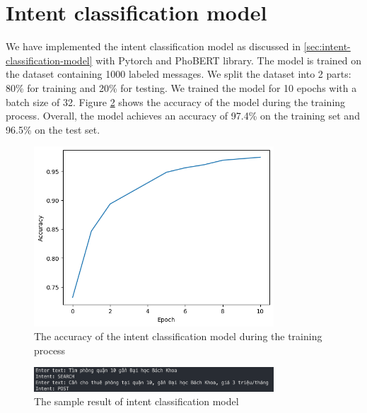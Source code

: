 \section{Intent classification model}
We have implemented the intent classification model as discussed in \ref{sec:intent-classification-model} with Pytorch and PhoBERT library. The model is trained on the dataset containing 1000 labeled messages. We split the dataset into 2 parts: 80\% for training and 20\% for testing. We trained the model for 10 epochs with a batch size of 32. Figure \ref{fig:intent-classification-result} shows the accuracy of the model during the training process. Overall, the model achieves an accuracy of 97.4\% on the training set and 96.5\% on the test set. 

\begin{figure}[ht]
    \centering
    \includegraphics[width=0.8\textwidth]{Images/9.Implementation/intent_classifier_accuracy.png} 
    \caption{The accuracy of the intent classification model during the training process}
    \label{fig:intent-classification-accuracy}
\end{figure}

\begin{figure}[ht]
    \centering
    \includegraphics[width=0.8\textwidth]{Images/9.Implementation/intent_classifier_result.png}
    \caption{The sample result of intent classification model}
    \label{fig:intent-classification-result}
\end{figure}
